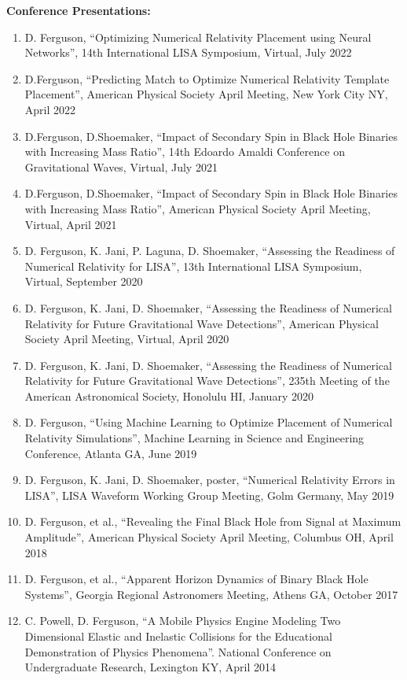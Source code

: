 \documentclass[11pt]{article}
\begin{document}
\begin{flushleft}
  \textbf{Conference Presentations:}
  \begin{enumerate}
  \item D. Ferguson, ``Optimizing Numerical Relativity Placement using Neural Networks'', 14th International LISA Symposium, Virtual, July 2022
  \item D.Ferguson, ``Predicting Match to Optimize Numerical Relativity Template Placement'', American Physical Society April Meeting, New York City NY, April 2022
  \item D.Ferguson, D.Shoemaker, ``Impact of Secondary Spin in Black Hole Binaries with Increasing Mass Ratio'', 14th Edoardo Amaldi Conference on Gravitational Waves, Virtual, July 2021
  \item D.Ferguson,  D.Shoemaker, ``Impact of Secondary Spin in Black Hole Binaries with Increasing Mass Ratio'',  American Physical Society April Meeting, Virtual, April 2021
  \item D. Ferguson, K. Jani, P. Laguna, D. Shoemaker, ``Assessing the Readiness of Numerical Relativity for LISA'', 13th International LISA Symposium, Virtual, September 2020
  \item D. Ferguson, K. Jani, D. Shoemaker, ``Assessing the Readiness of Numerical Relativity for Future Gravitational Wave Detections'', American Physical Society April Meeting, Virtual, April 2020
  \item D. Ferguson, K. Jani, D. Shoemaker, ``Assessing the Readiness of Numerical Relativity for Future Gravitational Wave Detections'', 235th Meeting of the American Astronomical Society, Honolulu HI, January 2020
  \item D. Ferguson, ``Using Machine Learning to Optimize Placement of Numerical Relativity Simulations'', Machine Learning in Science and Engineering Conference, Atlanta GA, June 2019
  \item D. Ferguson, K. Jani, D. Shoemaker, poster, ``Numerical Relativity Errors in LISA'', LISA Waveform Working Group Meeting, Golm Germany, May 2019
  \item D. Ferguson, et al., ``Revealing the Final Black Hole from Signal at Maximum Amplitude'', American Physical Society April Meeting, Columbus OH, April 2018
  \item D. Ferguson, et al., ``Apparent Horizon Dynamics of Binary Black Hole Systems'', Georgia Regional Astronomers Meeting, Athens GA, October 2017
  \item C. Powell, D. Ferguson, ``A Mobile Physics Engine Modeling Two Dimensional Elastic and Inelastic Collisions for the Educational Demonstration of Physics Phenomena''. National Conference on Undergraduate Research, Lexington KY, April 2014
  \end{enumerate} 


\end{flushleft}
\end{document}
